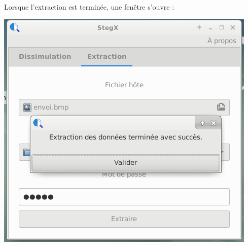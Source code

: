 \documentclass[11pt]{article}
\begin{document}
Lorsque l'extraction est terminée, une fenêtre s'ouvre : 

\hspace{2.5cm}
\includegraphics[scale=0.8]{pictures/extraction_3.png}
\vspace{1cm}
\end{document}
